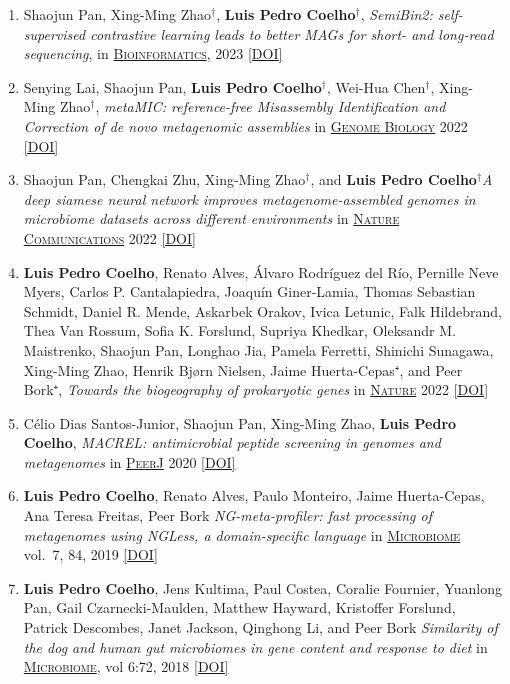 \documentclass{article}
\newcommand\showdoi[1]{%
    \href{https://doi.org/#1}{[DOI]}%
}
\newcommand\pubname[1]{\textsc{\uline{#1}}}
\newcommand\contribution[1]{\relax}
\newcommand\cosenior{${}^{\dagger}$}
\begin{document}
\begin{enumerate}[resume]
\item Shaojun Pan, Xing-Ming Zhao\cosenior, \textbf{Luis Pedro Coelho}\cosenior, \emph{SemiBin2: self-supervised contrastive learning leads to better MAGs for short- and long-read sequencing}, in \pubname{Bioinformatics}, 2023 \showdoi{10.1093/bioinformatics/btad209}

\item Senying Lai, Shaojun Pan, \textbf{Luis Pedro Coelho}\cosenior, Wei-Hua Chen\cosenior, Xing-Ming Zhao\cosenior, \emph{metaMIC: reference-free Misassembly Identification and Correction of de novo metagenomic assemblies} in \pubname{Genome Biology} 2022 \showdoi{10.1186/s13059-022-02810-y}


\item Shaojun Pan, Chengkai Zhu, Xing-Ming Zhao\cosenior, and \textbf{Luis Pedro Coelho}\cosenior \emph{A deep siamese neural network improves metagenome-assembled genomes in microbiome datasets across different environments} in \pubname{Nature Communications} 2022 \showdoi{10.1038/s41467-022-29843-y}

\item \textbf{Luis Pedro Coelho}, Renato Alves, Álvaro Rodríguez del Río, Pernille Neve Myers, Carlos P. Cantalapiedra, Joaquín Giner-Lamia, Thomas Sebastian Schmidt, Daniel R. Mende, Askarbek Orakov, Ivica Letunic, Falk Hildebrand, Thea Van Rossum, Sofia K. Forslund, Supriya Khedkar, Oleksandr M. Maistrenko, Shaojun Pan, Longhao Jia, Pamela Ferretti, Shinichi Sunagawa, Xing-Ming Zhao, Henrik Bjørn Nielsen, Jaime Huerta-Cepas⁺, and Peer Bork⁺, \emph{Towards the biogeography of prokaryotic genes} in \pubname{Nature} 2022 \showdoi{10.1038/s41586-021-04233-4}

\item Célio Dias Santos-Junior, Shaojun Pan, Xing-Ming Zhao, \textbf{Luis Pedro Coelho}, \emph{MACREL: antimicrobial peptide screening in genomes and metagenomes} in \pubname{PeerJ} 2020 \showdoi{10.7717/peerj.10555}

\item \textbf{Luis Pedro Coelho}, Renato Alves, Paulo Monteiro, Jaime Huerta-Cepas, Ana Teresa Freitas, Peer Bork \emph{NG-meta-profiler: fast processing of metagenomes using NGLess, a domain-specific language} in \pubname{Microbiome} vol.\ 7, 84, 2019 \showdoi{10.1186/s40168-019-0684-8}
\contribution{I conceived of the concept, co-wrote the software and the manuscript}

\item \textbf{Luis Pedro Coelho}, Jens Kultima, Paul Costea, Coralie Fournier, Yuanlong Pan, Gail Czarnecki-Maulden, Matthew Hayward, Kristoffer Forslund, Patrick Descombes, Janet Jackson, Qinghong Li, and Peer Bork \emph{Similarity of the dog and human gut microbiomes in gene content and response to diet} in \pubname{Microbiome}, vol 6:72, 2018 \showdoi{10.1186/s40168-018-0450-3}
\contribution{I designed and implemented the analysis strategy, wrote the first
version of the manuscript, and led the subsequent incorporation of co-author
suggestions.}


\end{enumerate}
\end{document}
